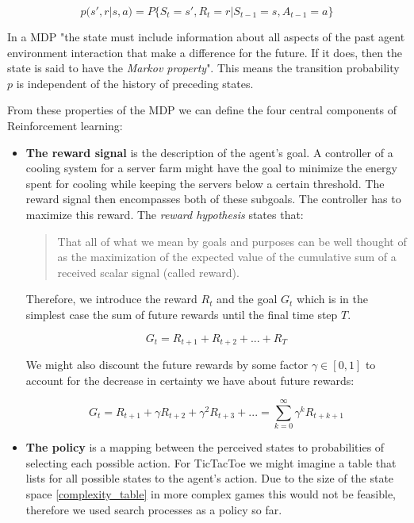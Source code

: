 \begin{equation}
    p(s', r | s, a) = P\{S_t=s', R_t = r | S_{t-1} = s, A_{t-1}=a\}
\end{equation}

In a MDP "the state must include information about all aspects of the past agent environment interaction that make a difference for the future. If it does, then the state is said to have the \textit{Markov property}". \cite[p. 48]{sutton_reinforcement_2018} This means the transition probability $p$ is independent of the history of preceding states.

From these properties of the MDP we can define the four central components of Reinforcement learning:

\begin{itemize}
    \item \textbf{The reward signal} is the description of the agent's goal. A controller of a cooling system for a server farm might have the goal to minimize the energy spent for cooling while keeping the servers below a certain threshold. The reward signal then encompasses both of these subgoals. The controller has to maximize this reward. The \textit{reward hypothesis} states that:
          \begin{quotation}
              That all of what we mean by goals and purposes can be well thought of as the maximization of the expected value of the cumulative sum of a received scalar signal (called reward). \cite[p. 52]{sutton_reinforcement_2018}
          \end{quotation}
          Therefore, we introduce the reward $R_t $ and the goal $ G_t $ which is in the simplest case the sum of future rewards until the final time step $T$.

          \begin{equation}
              G_t = R_{t+1} + R_{t+2} + ... + R_T
          \end{equation}

          We might also discount the future rewards by some factor $\gamma \in [0, 1] $ to account for the decrease in certainty we have about future rewards:

          \begin{equation}
              G_t = R_{t+1} + \gamma R_{t+2} + \gamma^2 R_{t+3} + ... = \sum_{k=0}^{\infty} \gamma^kR_{t+k+1}
          \end{equation}

    \item \textbf{The policy} is a mapping between the perceived states to probabilities of selecting each possible action. For TicTacToe we might imagine a table that lists for all possible states to the agent's action. Due to the size of the state space \ref{complexity_table} in more complex games this would not be feasible, therefore we used search processes as a policy so far.


\end{itemize}
